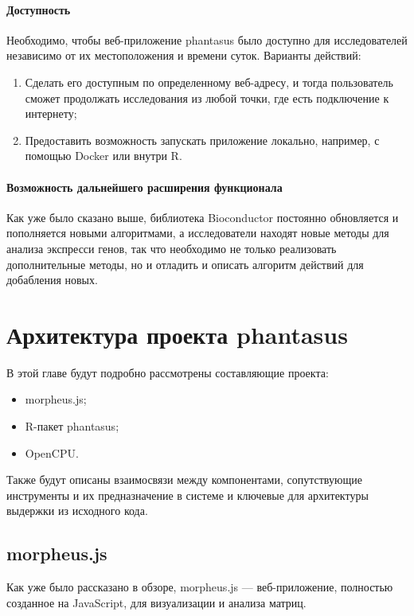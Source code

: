 \documentclass[annotation,specification]{itmo-student-thesis}
\begin{document}
\subsubsection{Доступность}
Необходимо, чтобы веб-приложение phantasus было доступно для исследователей независимо от их местоположения и времени суток. Варианты действий:

\begin{enumerate}
\item Сделать его доступным по определенному веб-адресу, и тогда пользователь сможет продолжать исследования из любой точки, где есть подключение к интернету;
\item Предоставить возможность запускать приложение локально, например, с помощью Docker или внутри R.
\end{enumerate}

\subsubsection{Возможность дальнейшего расширения функционала}
Как уже было сказано выше, библиотека Bioconductor постоянно обновляется и пополняется новыми алгоритмами, а исследователи находят новые методы для анализа экспресси генов, так что необходимо не только реализовать дополнительные методы, но и отладить и описать алгоритм действий для добабления новых.

\chapterconclusion

\chapter{Архитектура проекта phantasus}
В этой главе будут подробно рассмотрены составляющие проекта:
\begin{itemize}
\item morpheus.js;
\item R-пакет phantasus;
\item OpenCPU.
\end{itemize}
Также будут описаны взаимосвязи между компонентами, сопутствующие инструменты и их предназначение в системе и ключевые для архитектуры выдержки из исходного кода.

\section{morpheus.js}
Как уже было рассказано в обзоре, morpheus.js --- веб-приложение, полностью созданное на JavaScript, для визуализации и анализа матриц.
\end{document}
